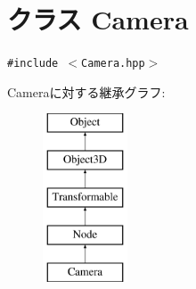 \hypertarget{classm3g_1_1Camera}{
\section{クラス Camera}
\label{classm3g_1_1Camera}
}
{\tt \#include $<$Camera.hpp$>$}

Cameraに対する継承グラフ:\begin{figure}[H]
\begin{center}
\leavevmode
\includegraphics[height=5cm]{classm3g_1_1Camera}
\end{center}
\end{figure}
